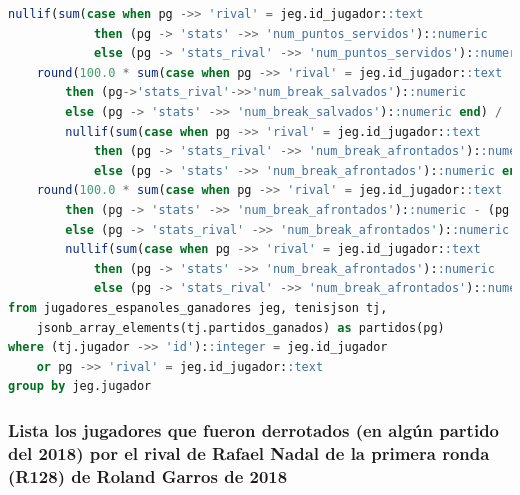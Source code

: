 \documentclass[10pt]{opticajnl}
\begin{document}
\begin{lstlisting}[language=SQL]
    	nullif(sum(case when pg ->> 'rival' = jeg.id_jugador::text 
    		then (pg -> 'stats' ->> 'num_puntos_servidos')::numeric 
    		else (pg -> 'stats_rival' ->> 'num_puntos_servidos')::numeric end), 0), 1) as pcje_restos_ganados,
    round(100.0 * sum(case when pg ->> 'rival' = jeg.id_jugador::text 
    	then (pg->'stats_rival'->>'num_break_salvados')::numeric 
    	else (pg -> 'stats' ->> 'num_break_salvados')::numeric end) / 
    	nullif(sum(case when pg ->> 'rival' = jeg.id_jugador::text 
    		then (pg -> 'stats_rival' ->> 'num_break_afrontados')::numeric 
    		else (pg -> 'stats' ->> 'num_break_afrontados')::numeric end), 0), 1) as pcje_breaks_salvados,
    round(100.0 * sum(case when pg ->> 'rival' = jeg.id_jugador::text 
    	then (pg -> 'stats' ->> 'num_break_afrontados')::numeric - (pg -> 'stats' ->> 'num_break_salvados')::numeric
    	else (pg -> 'stats_rival' ->> 'num_break_afrontados')::numeric - (pg -> 'stats_rival' ->> 'num_break_salvados')::numeric end) / 
    	nullif(sum(case when pg ->> 'rival' = jeg.id_jugador::text 
    		then (pg -> 'stats' ->> 'num_break_afrontados')::numeric 
    		else (pg -> 'stats_rival' ->> 'num_break_afrontados')::numeric end), 0), 1) as pcje_breaks_ganados
from jugadores_espanoles_ganadores jeg, tenisjson tj, 
	jsonb_array_elements(tj.partidos_ganados) as partidos(pg)
where (tj.jugador ->> 'id')::integer = jeg.id_jugador 
	or pg ->> 'rival' = jeg.id_jugador::text
group by jeg.jugador
\end{lstlisting}





\subsubsection{Lista los jugadores que fueron derrotados (en algún partido del 2018) por el rival de Rafael Nadal de la primera ronda (R128) de Roland Garros de 2018}
\end{document}
